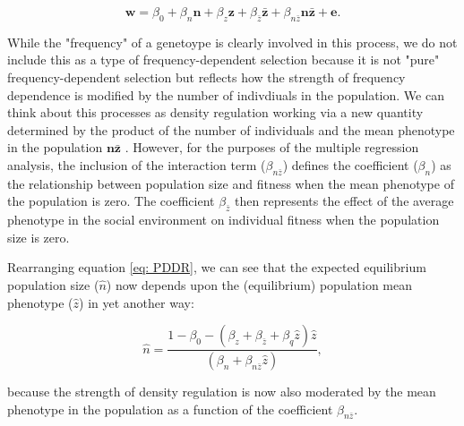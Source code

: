 \documentclass{article}
\begin{document}
\begin{equation} \label{eq: PDDR}
\bm{w}=\beta_{0} +\beta_{n} \bm{n} + \beta_{z} \bm{z}+ \beta_{\bar{z}} \bar{\bm{z}} + \beta_{n\bar{z}} \bm{n} \bar{\bm{z}}  +  \bm{e}.
\end{equation}

While the "frequency" of a genetoype is clearly involved in this process, we do not include this as a type of frequency-dependent selection because it is not "pure" frequency-dependent selection but reflects how the strength of frequency dependence is modified by the number of indivdiuals in the population. We can think about this processes as density regulation working via a new quantity determined by the product of the number of individuals and the mean phenotype in the population $\bm{n}\bar{\bm{z}}$ \citep{Engen2020}. However, for the purposes of the multiple regression analysis, the inclusion of the interaction term ($\beta_{n\bar{z}}$) defines the coefficient ($\beta_{n}$) as the relationship between population size and fitness when the mean phenotype of the population is zero. The coefficient $ \beta_{\bar{z}}$ then represents the effect of the average phenotype in the social environment on individual fitness when the population size is zero. 

Rearranging equation \ref{eq: PDDR}, we can see that the expected equilibrium population size ($\hat{n}$) now depends upon the (equilibrium) population mean phenotype ($\hat{z}$) in yet another way:

\begin{equation}
\hat{n} = \frac{1-\beta_{0}-(\beta_{z}  + \beta_{\bar{z}} + \beta_{q}\hat{z})\hat{z}}{(\beta_{n} +  \beta_{n\bar{z}} \hat{z})},
\end{equation}

\noindent because the strength of density regulation is now also moderated by the mean phenotype in the population as a function of the coefficient  $\beta_{n\bar{z}}$. 
\end{document}

